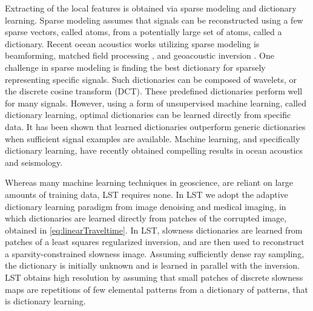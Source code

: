 Extracting of the local features is obtained via sparse modeling and dictionary learning.
Sparse modeling assumes that signals can be reconstructed using a few sparse vectors, called atoms, from a potentially large set of atoms, called a dictionary. Recent ocean acoustics works utilizing sparse modeling is beamforming\cite{Xenaki2014}, matched field processing \cite{Gemba2017}, and geoacoustic inversion \cite{gerstoft2018}. One challenge in sparse modeling is finding the best dictionary for sparsely representing specific signals. Such dictionaries can be composed of wavelets, or the discrete cosine transform (DCT). These predefined dictionaries perform well for many signals. However, using a form of unsupervised machine learning, called dictionary learning, optimal dictionaries can be learned directly from specific data\cite{mallat1999}. It has been shown that learned dictionaries outperform generic dictionaries when sufficient signal examples are available. Machine learning, and specifically dictionary learning, have recently obtained compelling results in ocean acoustics \cite{Bianco2017} and seismology\cite{kong2018}. 


Whereas many machine learning techniques in geoscience\cite{kong2018}, are reliant on large amounts of training data, LST\cite{bianco2018} requires none. In LST we adopt the adaptive dictionary learning paradigm from image denoising \cite{elad2010} and medical imaging\cite{ravishankar2011}, in which dictionaries are learned directly from patches of the corrupted image, obtained in \eqref{eq:linearTraveltime}. In LST, slowness dictionaries are learned from patches of a least squares regularized inversion, and are then used to reconstruct a sparsity-constrained slowness image. Assuming sufficiently dense ray sampling, the dictionary is initially unknown and is learned in parallel with the inversion. LST\cite{bianco2018} obtains high resolution by assuming that small patches of discrete slowness maps are repetitions of few elemental patterns from a dictionary of patterns, that is dictionary learning. 

